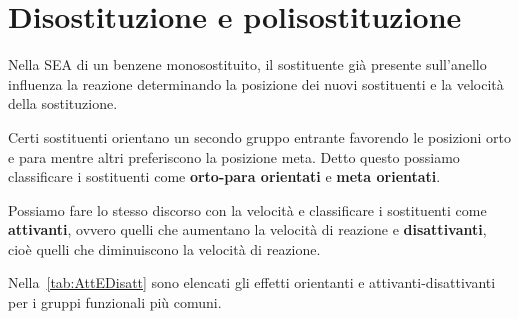 \section{Disostituzione e polisostituzione}
Nella \ac{SEA} di un benzene monosostituito, il sostituente già presente sull'anello influenza la reazione determinando la posizione dei nuovi sostituenti e la velocità della sostituzione.

Certi sostituenti orientano un secondo gruppo entrante favorendo le posizioni orto e para mentre altri preferiscono la posizione meta. Detto questo possiamo classificare i sostituenti come \textbf{orto-para orientati} e \textbf{meta orientati}.

Possiamo fare lo stesso discorso con la velocità e classificare i sostituenti come \textbf{attivanti}, ovvero quelli che aumentano la velocità di reazione e \textbf{disattivanti}, cioè quelli che diminuiscono la velocità di reazione.

Nella~\autoref{tab:AttEDisatt} sono elencati gli effetti orientanti e attivanti-disattivanti per i gruppi funzionali più comuni.

